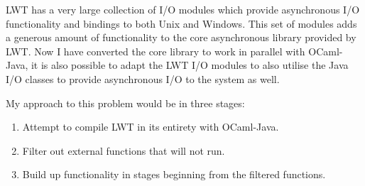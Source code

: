 \documentclass[12pt,twoside,notitlepage]{report}
\begin{document}
%
%

%
%

%
%

%
%

%
%

%
%

%
%
LWT has a very large collection of I/O modules which provide asynchronous I/O functionality and bindings to both Unix and Windows. This set of modules adds a generous amount of functionality to the core asynchronous library
provided by LWT. Now I have converted the core library to work in parallel with OCaml-Java, it is also possible to adapt the LWT I/O modules to also utilise the Java I/O classes to provide asynchronous I/O to the system as
well. 

My approach to this problem would be in three stages:

\begin{enumerate}
\item Attempt to compile LWT in its entirety with OCaml-Java.
\item Filter out external functions that will not run.
\item Build up functionality in stages beginning from the filtered functions.
\end{enumerate}
\end{document}
